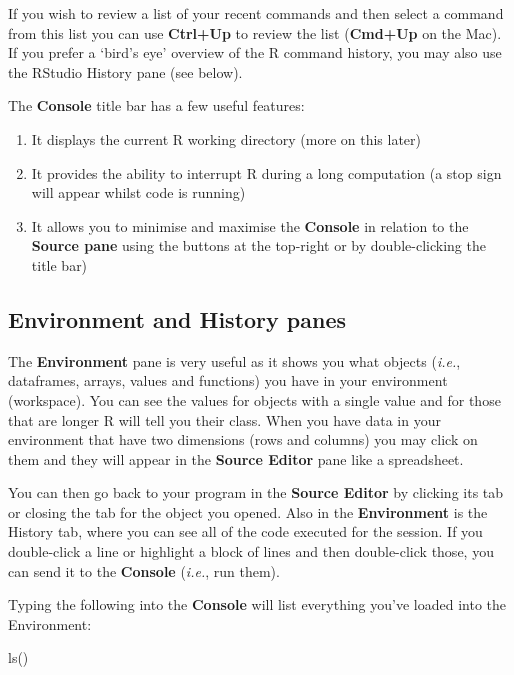 \documentclass[
]{book}
\newenvironment{Shaded}{\begin{snugshade}}{\end{snugshade}}
\newcommand{\FunctionTok}[1]{\textcolor[rgb]{0.00,0.00,0.00}{#1}}
\newcommand{\NormalTok}[1]{#1}
\begin{document}
If you wish to review a list of your recent commands and then select a command from this list you can use \textbf{Ctrl+Up} to review the list (\textbf{Cmd+Up} on the Mac). If you prefer a `bird's eye' overview of the R command history, you may also use the RStudio History pane (see below).

The \textbf{Console} title bar has a few useful features:

\begin{enumerate}
\def\labelenumi{\arabic{enumi}.}
\item
  It displays the current R working directory (more on this later)
\item
  It provides the ability to interrupt R during a long computation (a stop sign will appear whilst code is running)
\item
  It allows you to minimise and maximise the \textbf{Console} in relation to the \textbf{Source pane} using the buttons at the top-right or by double-clicking the title bar)
\end{enumerate}

\hypertarget{environment-and-history-panes}{%
\subsection{Environment and History panes}\label{environment-and-history-panes}}

The \textbf{Environment} pane is very useful as it shows you what objects (\emph{i.e.}, dataframes, arrays, values and functions) you have in your environment (workspace). You can see the values for objects with a single value and for those that are longer R will tell you their class. When you have data in your environment that have two dimensions (rows and columns) you may click on them and they will appear in the \textbf{Source Editor} pane like a spreadsheet.

You can then go back to your program in the \textbf{Source Editor} by clicking its tab or closing the tab for the object you opened. Also in the \textbf{Environment} is the History tab, where you can see all of the code executed for the session. If you double-click a line or highlight a block of lines and then double-click those, you can send it to the \textbf{Console} (\emph{i.e.}, run them).

Typing the following into the \textbf{Console} will list everything you've loaded into the Environment:

\begin{Shaded}
\begin{Highlighting}[]
\FunctionTok{ls}\NormalTok{()}
\end{Highlighting}
\end{Shaded}
\end{document}
